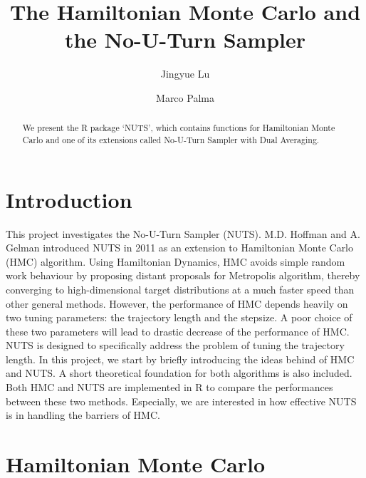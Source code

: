 \documentclass{article}
\title{The Hamiltonian Monte Carlo and the No-U-Turn Sampler}
\author{Jingyue Lu \and Marco Palma}
\begin{document}


\maketitle

\begin{abstract}
We present the R package `NUTS', which contains functions for Hamiltonian Monte Carlo and one of its extensions called No-U-Turn Sampler with Dual Averaging.
\end{abstract}

\section{Introduction}

This project investigates the No-U-Turn Sampler (NUTS). M.D. Hoffman and A. Gelman introduced NUTS in 2011 as an extension to Hamiltonian Monte Carlo (HMC) algorithm. Using Hamiltonian Dynamics, HMC avoids simple random work behaviour by proposing distant proposals for Metropolis algorithm, thereby converging to high-dimensional target distributions at a much faster speed than other general methods. However, the performance of HMC depends heavily on two tuning parameters: the trajectory length and the stepsize. A poor choice of these two parameters will lead to drastic decrease of the performance of HMC. NUTS is designed to specifically address the problem of tuning the trajectory length. In this project, we start by briefly introducing the ideas behind of HMC and NUTS. A short theoretical foundation for both algorithms is also included. Both HMC and NUTS are implemented in R to compare the performances between these two methods. Especially, we are interested in how effective NUTS is in handling the barriers of HMC.

\section{Hamiltonian Monte Carlo}
\end{document}

